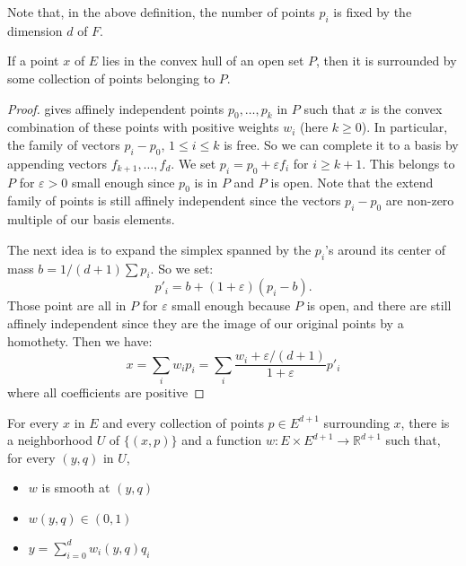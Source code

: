 Note that, in the above definition, the number of points $p_i$ is fixed
by the dimension $d$ of $F$.

\begin{lemma}
  \label{lem:int_cvx}
  If a point $x$ of $E$ lies in the convex hull of an open set $P$,
  then it is surrounded by some collection of points belonging to $P$.
\end{lemma}

\begin{proof}
   gives affinely independent points
  $p_0, \dots, p_k$ in $P$ such that $x$ is the convex combination of
  these points with positive weights $w_i$ (here $k \ge 0$).
  In particular, the family of vectors $p_i - p_0$, $1 ≤ i ≤ k$ is free.
  So we can complete it to a basis by appending vectors
  $f_{k+1}, \dots, f_d$.
  We set $p_i = p_0 + εf_i$ for $i \ge k+1$.
  This belongs to $P$ for $ε > 0$ small enough since $p_0$ is in $P$
  and $P$ is open.
  Note that the extend family of points is still affinely independent
  since the vectors $p_i - p_0$ are non-zero multiple of our basis
  elements.

  The next idea is to expand the simplex spanned by the $p_i$'s around its
  center of mass $b = 1/(d+1)\sum p_i$. So we set:
  \[
    p'_i = b + (1 + ε)(p_i - b).
  \]
  Those point are all in $P$ for $ε$ small enough because $P$ is open,
  and there are still affinely independent since they are the image of
  our original points by a homothety.
  Then we have:
  \[
    x = \sum_i w_i p_i = \sum_i \frac{w_i + ε/(d+1)}{1 + ε} p'_i
  \]
  where all coefficients are positive
\end{proof}


\begin{lemma}
  \label{lem:smooth_barycentric_coord}
  For every $x$ in $E$ and every collection of points $p ∈ E^{d+1}$
  surrounding $x$, there is a neighborhood $U$ of $\{(x, p)\}$
  and a function $w : E × E^{d+1} → ℝ^{d+1}$ such that, for every
  $(y, q)$ in $U$,
  \begin{itemize}
    \item
      $w$ is smooth at $(y, q)$
    \item
      $w(y, q) ∈ (0, 1)$
    \item
      $y = \sum_{i=0}^d w_i(y, q)q_i$
  \end{itemize}
\end{lemma}

